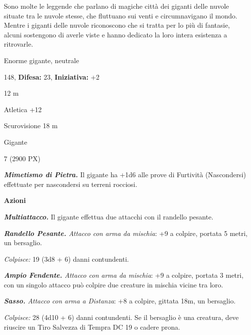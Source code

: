\begin{multicols}{2}
{Sono molte le leggende che parlano di magiche città dei giganti delle nuvole situate tra le nuvole stesse, che fluttuano sui venti e circumnavigano il mondo. Mentre i giganti delle nuvole riconoscono che si tratta per lo più di fantasie, alcuni sostengono di averle viste e hanno dedicato la loro intera esistenza a ritrovarle.

\noindent
\begin{description}[noitemsep, topsep=0pt, parsep=0pt, partopsep=0pt, leftmargin=0cm, labelwidth=2.2cm]
	\item[\textbf{Taglia/Tipo:}] Enorme gigante, neutrale
	\item[\textbf{Caratt.:}] 
	\item[\textbf{Punti Ferita:}] 148,  \textbf{Difesa:} 23,  \textbf{Iniziativa:} +2
	\item[\textbf{Movimento:}] 12 m
	\item[\textbf{Tiri Salvez.:}] 
	\item[\textbf{Comp.:}] Atletica +12
	\item[\textbf{Sensi:}] Scurovisione 18 m
	\item[\textbf{Linguaggi:}] Gigante
	\item[\textbf{Sfida:}] 7 (2900 PX)\smallskip
\end{description}

\emph{\textbf{Mimetismo di Pietra.}} Il gigante ha +1d6 alle prove di Furtività (Nascondersi) effettuate per nascondersi su terreni rocciosi.

\textbf{Azioni}

\emph{\textbf{Multiattacco.}} Il gigante effettua due attacchi con il randello pesante.

\emph{\textbf{Randello Pesante.} Attacco con arma da mischia}: +9 a colpire, portata 5 metri, un bersaglio.

\emph{Colpisce:} 19 (3d8 + 6) danni contundenti.

\emph{\textbf{Ampio Fendente.} Attacco con arma da mischia}: +9 a colpire, portata 3 metri, con un singolo attacco può colpire due creature in mischia vicine tra loro.

\emph{\textbf{Sasso.} Attacco con arma a Distanza}: +8 a colpire, gittata 18m, un bersaglio.

\emph{Colpisce:} 28 (4d10 + 6) danni contundenti. Se il bersaglio è una creatura, deve riuscire un Tiro Salvezza di Tempra DC 19 o cadere prona.

}
\end{multicols}
